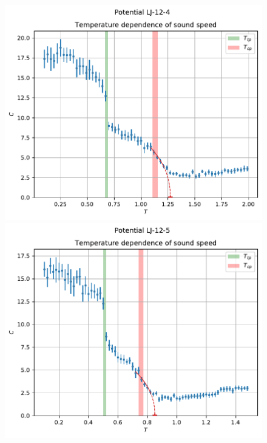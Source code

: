 \documentclass[pdf,hyperref={unicode}]{beamer}
\begin{document}
\begin{frame}
\transdissolve[duration=0.2]

\begin{figure}[h]
\begin{center}
\begin{minipage}[h]{0.35\linewidth}
\includegraphics[width=\textwidth, keepaspectratio]{sound_speed_Potential LJ-12-4_1}
\end{minipage}
\begin{minipage}[h]{0.35\linewidth}
\includegraphics[width=\textwidth, keepaspectratio]{sound_speed_Potential LJ-12-5_1}
\end{minipage}


\end{center}
\end{figure}
\end{frame}
\end{document}
